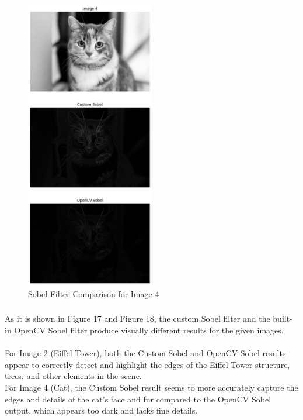 \documentclass[12pt]{article}
\begin{document}
  \begin{figure}
    \centering
    \includegraphics[width=0.5\textwidth]{sobel_filter_comparison_image4.png}
    \caption{Sobel Filter Comparison for Image 4}
    \label{fig:example}
  \end{figure}

  
\subsubsection{}
  As it is shown in Figure 17 and Figure 18, the custom Sobel filter and the built-in OpenCV Sobel filter produce visually different results for the given images. \\
  \\
  For Image 2 (Eiffel Tower), both the Custom Sobel and OpenCV Sobel results appear to correctly detect and highlight the edges of the Eiffel Tower structure, trees, and other elements in the scene.\\
  For Image 4 (Cat), the Custom Sobel result seems to more accurately capture the edges and details of the cat's face and fur compared to the OpenCV Sobel output, which appears too dark and lacks fine details.\\
\end{document}
